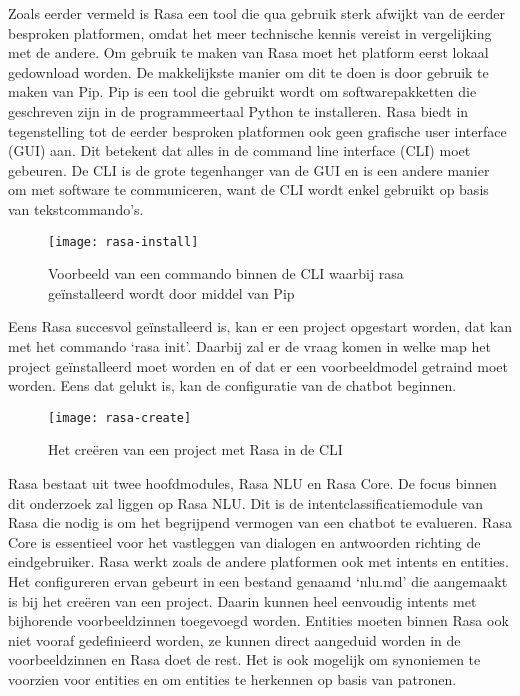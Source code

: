 Zoals eerder vermeld is Rasa een tool die qua gebruik sterk afwijkt van de eerder besproken platformen, omdat het meer technische kennis vereist in vergelijking met de andere. Om gebruik te maken van Rasa moet het platform eerst lokaal gedownload worden. De makkelijkste manier om dit te doen is door gebruik te maken van Pip. Pip is een tool die gebruikt wordt om softwarepakketten die geschreven zijn in de programmeertaal Python te installeren. Rasa biedt in tegenstelling tot de eerder besproken platformen ook geen grafische user interface (GUI) aan. Dit betekent dat alles in de command line interface (CLI) moet gebeuren. De CLI is de grote tegenhanger van de GUI en is een andere manier om met software te communiceren, want de CLI wordt enkel gebruikt op basis van tekstcommando's.

\begin{figure}[H]
    \label{fig:rasa-install}
    \centering
    \texttt{[image: rasa-install]}
    \caption{Voorbeeld van een commando binnen de CLI waarbij rasa geïnstalleerd wordt door middel van Pip}
\end{figure}

Eens Rasa succesvol geïnstalleerd is, kan er een project opgestart worden, dat kan met het commando ‘rasa init’. Daarbij zal er de vraag komen in welke map het project geïnstalleerd moet worden en of dat er een voorbeeldmodel getraind moet worden. Eens dat gelukt is, kan de configuratie van de chatbot beginnen.

\begin{figure}[H]
    \label{fig:rasa-create}
    \centering
    \texttt{[image: rasa-create]}
    \caption{Het creëren van een project met Rasa in de CLI}
\end{figure}

Rasa bestaat uit twee hoofdmodules, Rasa NLU en Rasa Core. De focus binnen dit onderzoek zal liggen op Rasa NLU. Dit is de intentclassificatiemodule van Rasa die nodig is om het begrijpend vermogen van een chatbot te evalueren. Rasa Core is essentieel voor het vastleggen van dialogen en antwoorden richting de eindgebruiker. Rasa werkt zoals de andere platformen ook met intents en entities. Het configureren ervan gebeurt in een bestand genaamd ‘nlu.md’ die aangemaakt is bij het creëren van een project. Daarin kunnen heel eenvoudig intents met bijhorende voorbeeldzinnen toegevoegd worden. Entities moeten binnen Rasa ook niet vooraf gedefinieerd worden, ze kunnen direct aangeduid worden in de voorbeeldzinnen en Rasa doet de rest. Het is ook mogelijk om synoniemen te voorzien voor entities en om entities te herkennen op basis van patronen.


